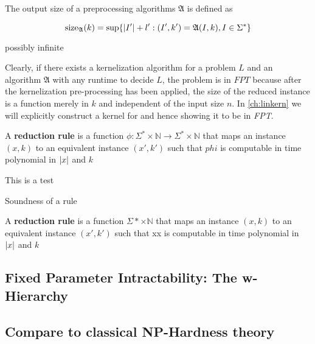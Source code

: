 \begin{definition} The output size of a preprocessing algorithms $\mathfrak{A}$ is defined as 

    \[\mathrm{size}_{\mathfrak{A}}(k) = \sup\{\abs{I'} + l': (I',k')= \mathfrak{A}(I,k), I \in \Sigma^* \} \]
\end{definition}

possibly infinite

Clearly, if there exists a kernelization algorithm for a problem $L$ and an algorithm $\mathfrak{A}$ with any runtime to decide $L$, the problem is in $FPT$ because after the kernelization pre-processing has been applied, the size of the reduced instance is a function merely in $k$ and independent of the input size $n$. In \cref{ch:linkern} we will explicitly construct a kernel for \psdom and hence showing it to be in \textit{FPT}. 


\begin{definition}
A \textbf{reduction rule} is a function $\phi:\Sigma^* \times \mathbb{N} \rightarrow \Sigma^* \times \mathbb{N}$ that maps an instance $(x,k)$ to an equivalent instance $(x',k')$ such that $phi$ is computable in time polynomial in $\abs{x}$ and $k$
\end{definition}

\begin{definition}
     This is a test
\end{definition}

\begin{definition}{Soundness of a rule}

\end{definition}

A \textbf{reduction rule} is a function $\Sigma* \times \mathbb{N}$ that maps an instance $(x,k)$ to an equivalent instance $(x',k')$ such that xx is computable in time polynomial in $\abs{x}$ and $k$

\subsection{Fixed Parameter Intractability: The w-Hierarchy}
\subsection{Compare to classical NP-Hardness theory}

